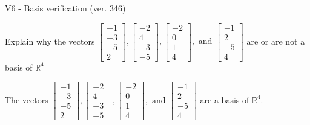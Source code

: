 \begin{exercise}
  \begin{exerciseTitle}V6 - Basis verification (ver. 346)\end{exerciseTitle}
  \begin{exerciseStatement}
    Explain why the vectors \(\left[\begin{array}{r}
-1 \\
-3 \\
-5 \\
2
\end{array}\right] , \left[\begin{array}{r}
-2 \\
4 \\
-3 \\
-5
\end{array}\right] , \left[\begin{array}{r}
-2 \\
0 \\
1 \\
4
\end{array}\right] , \text{ and } \left[\begin{array}{r}
-1 \\
2 \\
-5 \\
4
\end{array}\right]\) are or are not a basis of \(\mathbb{R}^4\)	


  \end{exerciseStatement}
  \begin{exerciseAnswer}
   The vectors \(\left[\begin{array}{r}
-1 \\
-3 \\
-5 \\
2
\end{array}\right] , \left[\begin{array}{r}
-2 \\
4 \\
-3 \\
-5
\end{array}\right] , \left[\begin{array}{r}
-2 \\
0 \\
1 \\
4
\end{array}\right] , \text{ and } \left[\begin{array}{r}
-1 \\
2 \\
-5 \\
4
\end{array}\right]\) 
  	 are  a basis of \(\mathbb{R}^4\).
  


  \end{exerciseAnswer}
\end{exercise}